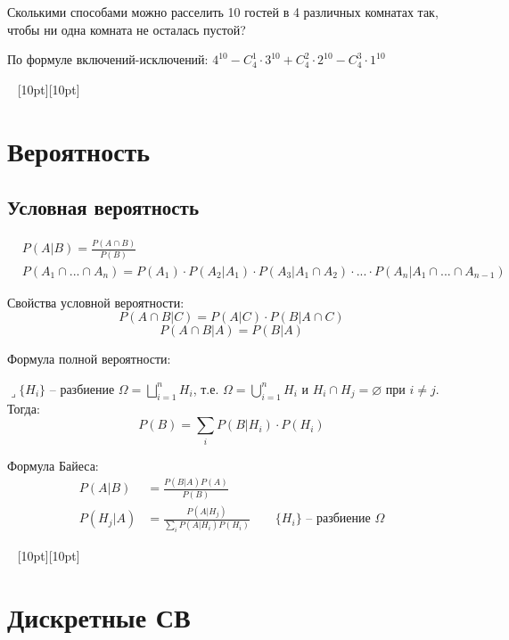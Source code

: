 \documentclass[a4paper,12pt,fleqn]{article}
\newenvironment{onsamepage} {\begin{minipage}{\textwidth}} {\end{minipage}}
\numberwithin{figure}{section}
\theoremstyle{definition}
\def\lets{{\huge$\lrcorner$}\space}
\def\vignette{\vspace{48pt} \noindent \hrulefill~
	          \raisebox{-8pt}[10pt][10pt]{\Huge\ding{102}}
	          ~\hrulefill}
\begin{document}
\begin{onsamepage}
Сколькими способами можно расселить 10 гостей в 4 различных комнатах так,
чтобы ни одна комната не осталась пустой?
\begin{solution}
	По формуле включений-исключений:
	$4^{10} - C_4^1 \cdot 3^{10} + C_4^2 \cdot 2^{10} - C_4^3 \cdot 1^{10}$
\end{solution}
\end{onsamepage}


\vignette
\section{Вероятность}

\subsection{Условная вероятность}

\begin{onsamepage}
\begin{align*}
&	P(A|B) = \frac{P(A \cap B)}{P(B)}
\\&	P(A_1 \cap ... \cap A_n)
	= P(A_1) \cdot P(A_2|A_1) \cdot P(A_3|A_1 \cap A_2)
	  \cdot ... \cdot P(A_n|A_1 \cap ... \cap A_{n-1})
\end{align*}

Свойства условной вероятности:
\[ P(A \cap B|C) = P(A|C) \cdot P(B|A \cap C) \]
\[ P(A \cap B|A) = P(B|A) \]
\end{onsamepage}

Формула полной вероятности:

\lets $\{H_i\}$ -- разбиение $\Omega = \bigsqcup_{i=1}^n H_i$, т.е.
$\Omega = \bigcup_{i=1}^n H_i$ и $H_i \cap H_j = \varnothing$ при $i \ne j$.
Тогда:
\[ P(B) = \sum_i P(B|H_i) \cdot P(H_i)  \]

Формула Байеса:
\begin{align*}
P(A|B) &= \frac{P(B|A) P(A)}{P(B)} \\
P(H_j|A) &= \frac{P(A|H_j)}{\sum_i P(A|H_i) P(H_i)}
			\qquad \{H_i\} \text{ -- разбиение } \Omega
\end{align*}


\vignette
\section{Дискретные СВ}
\end{document}
